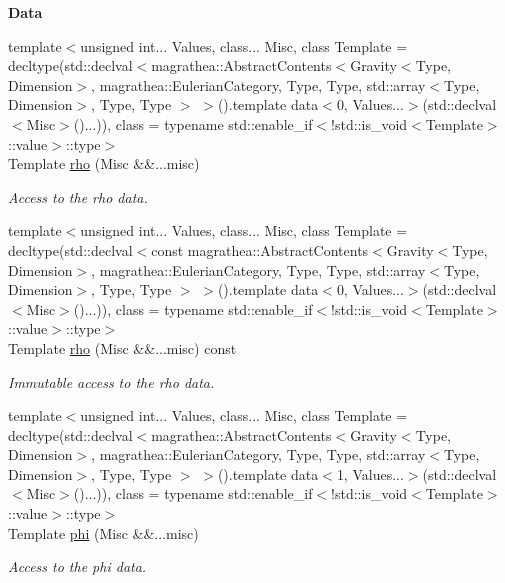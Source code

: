 \begin{Indent}{\bf Data}\par
\begin{DoxyCompactItemize}
\item 
{\footnotesize template$<$unsigned int... Values, class... Misc, class Template  = decltype(std\-::declval$<$magrathea\-::\-Abstract\-Contents$<$\-Gravity$<$\-Type, Dimension$>$, magrathea\-::\-Eulerian\-Category, Type, Type, std\-::array$<$\-Type, Dimension$>$, Type, Type $>$ $>$().\-template data$<$0, Values...$>$(std\-::declval$<$\-Misc$>$()...)), class  = typename std\-::enable\-\_\-if$<$!std\-::is\-\_\-void$<$\-Template$>$\-::value$>$\-::type$>$ }\\Template \hyperlink{exceptionGravity_a2d44fd05ca6c4c530dc6080a1343ddb1}{rho} (Misc \&\&...misc)
\begin{DoxyCompactList}\small\item\em Access to the rho data. \end{DoxyCompactList}\item 
{\footnotesize template$<$unsigned int... Values, class... Misc, class Template  = decltype(std\-::declval$<$const magrathea\-::\-Abstract\-Contents$<$\-Gravity$<$\-Type, Dimension$>$, magrathea\-::\-Eulerian\-Category, Type, Type, std\-::array$<$\-Type, Dimension$>$, Type, Type $>$ $>$().\-template data$<$0, Values...$>$(std\-::declval$<$\-Misc$>$()...)), class  = typename std\-::enable\-\_\-if$<$!std\-::is\-\_\-void$<$\-Template$>$\-::value$>$\-::type$>$ }\\Template \hyperlink{exceptionGravity_a1c46caab7acffb6df96b7c1dcc2973b2}{rho} (Misc \&\&...misc) const 
\begin{DoxyCompactList}\small\item\em Immutable access to the rho data. \end{DoxyCompactList}\item 
{\footnotesize template$<$unsigned int... Values, class... Misc, class Template  = decltype(std\-::declval$<$magrathea\-::\-Abstract\-Contents$<$\-Gravity$<$\-Type, Dimension$>$, magrathea\-::\-Eulerian\-Category, Type, Type, std\-::array$<$\-Type, Dimension$>$, Type, Type $>$ $>$().\-template data$<$1, Values...$>$(std\-::declval$<$\-Misc$>$()...)), class  = typename std\-::enable\-\_\-if$<$!std\-::is\-\_\-void$<$\-Template$>$\-::value$>$\-::type$>$ }\\Template \hyperlink{exceptionGravity_adb0a25af2a240305c212eca3b0e6efac}{phi} (Misc \&\&...misc)
\begin{DoxyCompactList}\small\item\em Access to the phi data. \end{DoxyCompactList}\item 

\end{DoxyCompactItemize}
\end{Indent}
